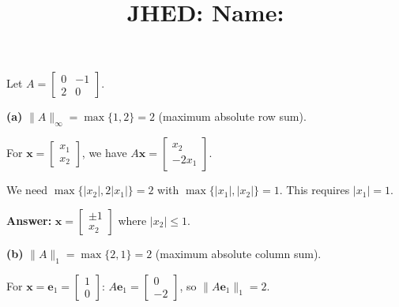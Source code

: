 \documentclass[reqno]{exam}
\title{\normalsize{
  JHED: \underline{\hspace{4cm}} \hspace{1em} Name: \underline{\hspace{9cm}}}
   }
\author{}
\date{}
\begin{document}
\maketitle
\vspace{-2cm} %

\begin{questions}

\question 
Let $A = \begin{bmatrix} 0 & -1 \\ 2 & 0 \end{bmatrix}$.

\begin{solution}
\textbf{(a)} $\|A\|_\infty = \max\{1, 2\} = 2$ (maximum absolute row sum).

For $\mathbf{x} = \begin{bmatrix} x_1 \\ x_2 \end{bmatrix}$, we have $A\mathbf{x} = \begin{bmatrix} x_2 \\ -2x_1 \end{bmatrix}$.

We need $\max\{|x_2|, 2|x_1|\} = 2$ with $\max\{|x_1|, |x_2|\} = 1$. This requires $|x_1| = 1$.

\textbf{Answer:} $\mathbf{x} = \begin{bmatrix} \pm 1 \\ x_2 \end{bmatrix}$ where $|x_2| \leq 1$.

\textbf{(b)} $\|A\|_1 = \max\{2, 1\} = 2$ (maximum absolute column sum).

For $\mathbf{x} = \mathbf{e}_1 = \begin{bmatrix} 1 \\ 0 \end{bmatrix}$: $A\mathbf{e}_1 = \begin{bmatrix} 0 \\ -2 \end{bmatrix}$, so $\|A\mathbf{e}_1\|_1 = 2$.


\end{solution}
\end{questions}
\end{document}
